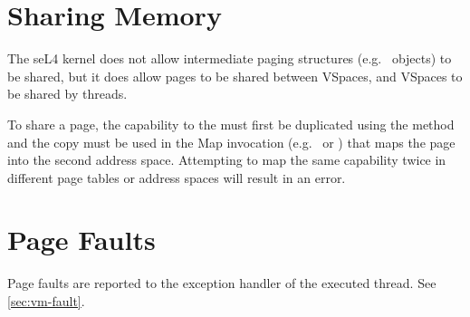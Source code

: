\section{Sharing Memory}

The seL4 kernel does not allow intermediate paging structures (e.g.\  objects) to be
shared, but it does allow pages to be shared between VSpaces, and VSpaces to be shared by threads.

To share a page, the capability to the  must first be duplicated using the
 method and the copy must be used in the Map invocation
(e.g.\  \ifxeightsix or
\fi) that maps the page into the second address space.
Attempting to map the same capability twice in different page tables or address spaces will result
in an error.


\section{Page Faults}

Page faults are reported to the exception handler of the executed thread.
See \autoref{sec:vm-fault}.
